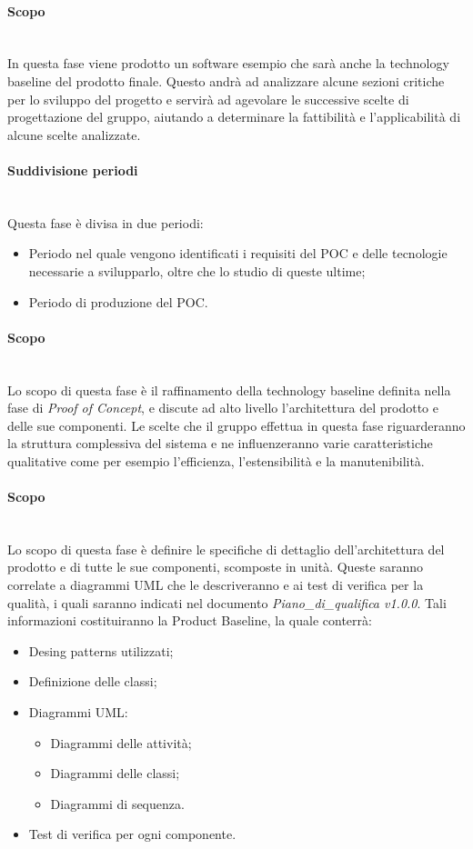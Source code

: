	\paragraph {Scopo}\mbox{}\\
	In questa fase viene prodotto un software esempio che sarà anche la technology baseline del prodotto finale. Questo andrà ad analizzare alcune sezioni critiche per lo sviluppo del progetto e servirà ad agevolare le successive scelte di progettazione del gruppo, aiutando a determinare la fattibilità e l'applicabilità di alcune scelte analizzate.
	\paragraph {Suddivisione periodi}\mbox{}\\
	Questa fase è divisa in due periodi:
	\begin{itemize}
		\item Periodo nel quale vengono identificati i requisiti del POC e delle 	tecnologie necessarie a svilupparlo, oltre che lo studio di queste ultime;
		\item Periodo di produzione del POC.
	\end{itemize}
	\paragraph {Scopo}\mbox{}\\
	Lo scopo di questa fase è il raffinamento della technology baseline definita nella fase di \textit{Proof of Concept}, e discute ad alto livello l'architettura del prodotto e delle sue componenti. Le scelte che il gruppo effettua in questa fase riguarderanno la struttura complessiva del sistema e ne influenzeranno varie caratteristiche qualitative come per esempio l'efficienza, l'estensibilità e la manutenibilità.
	\paragraph {Scopo}\mbox{}\\
	Lo scopo di questa fase è definire le specifiche di dettaglio dell’architettura del prodotto e di tutte le sue componenti, scomposte in unità. Queste saranno correlate a diagrammi UML che le descriveranno e ai test di verifica per la qualità, i quali saranno indicati nel documento \textit{Piano\_di\_qualifica v1.0.0}. Tali informazioni costituiranno la Product Baseline, la quale conterrà:
	\begin{itemize}
		\item Desing patterns utilizzati;
		\item Definizione delle classi;
		\item Diagrammi UML:
		\begin{itemize}
			\item Diagrammi delle attività;
			\item Diagrammi delle classi;
			\item Diagrammi di sequenza.
		\end{itemize}
		\item Test di verifica per ogni componente.
	\end{itemize}
